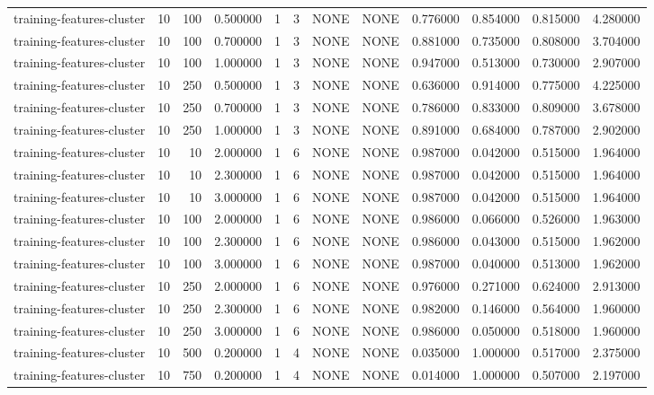 \begin{tabular}{lrrrllllrrrr}
training-features-cluster & 10 & 100 & 0.500000 & 1 & 3 & NONE & NONE & 0.776000 & 0.854000 & 0.815000 & 4.280000 \\
training-features-cluster & 10 & 100 & 0.700000 & 1 & 3 & NONE & NONE & 0.881000 & 0.735000 & 0.808000 & 3.704000 \\
training-features-cluster & 10 & 100 & 1.000000 & 1 & 3 & NONE & NONE & 0.947000 & 0.513000 & 0.730000 & 2.907000 \\
training-features-cluster & 10 & 250 & 0.500000 & 1 & 3 & NONE & NONE & 0.636000 & 0.914000 & 0.775000 & 4.225000 \\
training-features-cluster & 10 & 250 & 0.700000 & 1 & 3 & NONE & NONE & 0.786000 & 0.833000 & 0.809000 & 3.678000 \\
training-features-cluster & 10 & 250 & 1.000000 & 1 & 3 & NONE & NONE & 0.891000 & 0.684000 & 0.787000 & 2.902000 \\
training-features-cluster & 10 & 10 & 2.000000 & 1 & 6 & NONE & NONE & 0.987000 & 0.042000 & 0.515000 & 1.964000 \\
training-features-cluster & 10 & 10 & 2.300000 & 1 & 6 & NONE & NONE & 0.987000 & 0.042000 & 0.515000 & 1.964000 \\
training-features-cluster & 10 & 10 & 3.000000 & 1 & 6 & NONE & NONE & 0.987000 & 0.042000 & 0.515000 & 1.964000 \\
training-features-cluster & 10 & 100 & 2.000000 & 1 & 6 & NONE & NONE & 0.986000 & 0.066000 & 0.526000 & 1.963000 \\
training-features-cluster & 10 & 100 & 2.300000 & 1 & 6 & NONE & NONE & 0.986000 & 0.043000 & 0.515000 & 1.962000 \\
training-features-cluster & 10 & 100 & 3.000000 & 1 & 6 & NONE & NONE & 0.987000 & 0.040000 & 0.513000 & 1.962000 \\
training-features-cluster & 10 & 250 & 2.000000 & 1 & 6 & NONE & NONE & 0.976000 & 0.271000 & 0.624000 & 2.913000 \\
training-features-cluster & 10 & 250 & 2.300000 & 1 & 6 & NONE & NONE & 0.982000 & 0.146000 & 0.564000 & 1.960000 \\
training-features-cluster & 10 & 250 & 3.000000 & 1 & 6 & NONE & NONE & 0.986000 & 0.050000 & 0.518000 & 1.960000 \\
training-features-cluster & 10 & 500 & 0.200000 & 1 & 4 & NONE & NONE & 0.035000 & 1.000000 & 0.517000 & 2.375000 \\
training-features-cluster & 10 & 750 & 0.200000 & 1 & 4 & NONE & NONE & 0.014000 & 1.000000 & 0.507000 & 2.197000 \\

\end{tabular}
